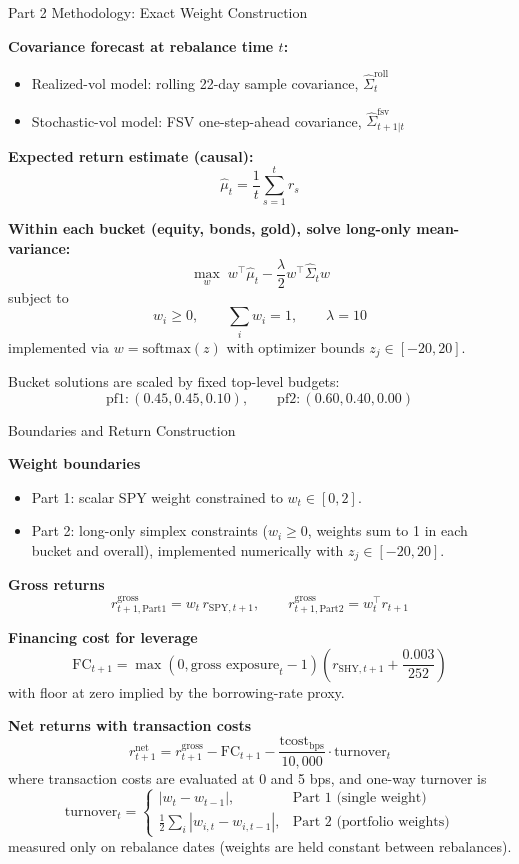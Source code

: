 \documentclass[10pt]{beamer}\usepackage[]{graphicx}\usepackage[table]{xcolor}
\begin{document}
\begin{frame}{Part 2 Methodology: Exact Weight Construction}

  \textbf{Covariance forecast at rebalance time $t$:}
  \begin{itemize}
    \item Realized-vol model: rolling 22-day sample covariance, $\hat{\Sigma}^{\text{roll}}_t$
    \item Stochastic-vol model: FSV one-step-ahead covariance, $\hat{\Sigma}^{\text{fsv}}_{t+1|t}$
  \end{itemize}

  \textbf{Expected return estimate (causal):}
  \[
    \hat{\mu}_t = \frac{1}{t}\sum_{s=1}^{t} r_s
  \]

  \textbf{Within each bucket (equity, bonds, gold), solve long-only mean-variance:}
  \[
    \max_{w}\; w^\top \hat{\mu}_t - \frac{\lambda}{2}w^\top \hat{\Sigma}_t w
  \]
  subject to
  \[
    w_i \ge 0,\qquad \sum_i w_i = 1, \qquad \lambda = 10
  \]
  implemented via $w=\mathrm{softmax}(z)$ with optimizer bounds $z_j \in [-20,20]$.

  \vspace{0.4em}
  Bucket solutions are scaled by fixed top-level budgets:
  \[
    \text{pf1}: (0.45,0.45,0.10),\qquad \text{pf2}: (0.60,0.40,0.00)
  \]

\end{frame}

\begin{frame}{Boundaries and Return Construction}

  \textbf{Weight boundaries}
  \begin{itemize}
    \item Part 1: scalar SPY weight constrained to $w_t \in [0,2]$.
    \item Part 2: long-only simplex constraints ($w_i \ge 0$, weights sum to 1 in each bucket and overall), implemented numerically with $z_j \in [-20,20]$.
  \end{itemize}

  \textbf{Gross returns}
  \[
    r^{\text{gross}}_{t+1,\text{Part1}} = w_t \, r_{\text{SPY},t+1}, \qquad
    r^{\text{gross}}_{t+1,\text{Part2}} = w_t^\top r_{t+1}
  \]

  \textbf{Financing cost for leverage}
  \[
    \text{FC}_{t+1} =
    \max(0,\text{gross exposure}_t-1)\left(r_{\text{SHY},t+1}+\frac{0.003}{252}\right)
  \]
  with floor at zero implied by the borrowing-rate proxy.

  \textbf{Net returns with transaction costs}
  \[
    r^{\text{net}}_{t+1} =
    r^{\text{gross}}_{t+1} - \text{FC}_{t+1} - \frac{\text{tcost}_{\text{bps}}}{10{,}000}\cdot \text{turnover}_t
  \]
  where transaction costs are evaluated at 0 and 5 bps, and one-way turnover is
  \[
    \text{turnover}_t =
    \begin{cases}
      |w_t-w_{t-1}|, & \text{Part 1 (single weight)}\\
      \frac{1}{2}\sum_i |w_{i,t}-w_{i,t-1}|, & \text{Part 2 (portfolio weights)}
    \end{cases}
  \]
  measured only on rebalance dates (weights are held constant between rebalances).

\end{frame}
\end{document}

